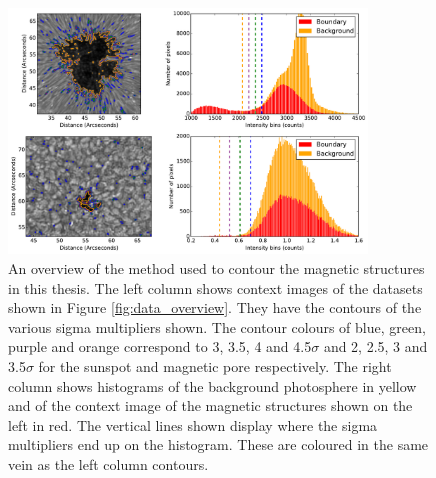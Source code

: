     \begin{figure}
        \centering
        \includegraphics[width=0.85\textwidth]{method_overview.pdf}
        \caption{
                An overview of the method used to contour the magnetic structures in this thesis.
                The left column shows context images of the datasets shown in Figure \ref{fig:data_overview}.
                They have the contours of the various sigma multipliers shown.
                The contour colours of blue, green, purple and orange correspond to 3, 3.5, 4 and 4.5$\sigma$ and 2, 2.5, 3 and 3.5$\sigma$ for the sunspot and magnetic pore respectively.
                The right column shows histograms of the background photosphere in yellow and of the context image of the magnetic structures shown on the left in red.
                The vertical lines shown display where the sigma multipliers end up on the histogram.
                These are coloured in the same vein as the left column contours.
                }
        \label{fig:method_overview}
    \end{figure}
    
